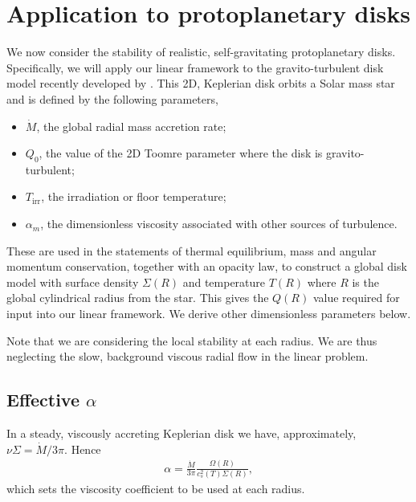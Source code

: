 \section{Application to protoplanetary disks}\label{2dppd}
We now consider the stability of realistic, self-gravitating
protoplanetary disks. Specifically, we will apply our linear framework
to the gravito-turbulent disk model recently developed by 
\cite{rafikov15}. This 2D, Keplerian disk orbits a Solar mass star and 
is defined by the following parameters, 

\begin{itemize}
  \item $\dot{M}$, the global radial mass accretion rate;
  \item $Q_0$, the value of the 2D Toomre parameter where the disk is
    gravito-turbulent;
  \item $T_\mathrm{irr}$, the irradiation or floor temperature;
  \item $\alpha_m$, the dimensionless viscosity associated with other
    sources of turbulence.
\end{itemize} 
These are used in the statements of thermal equilibrium, mass and
angular momentum conservation, together with an opacity law, 
to construct a global disk model with surface density $\Sigma(R)$ and
temperature $T(R)$ where $R$ is the global cylindrical radius from the
star. \citep[See][for details.]{rafikov15} This gives the $Q(R)$
value required for input into our linear framework. We derive other
dimensionless parameters below. 

Note that we are considering the local stability at each radius. We
are thus neglecting the slow, background viscous radial flow in the
linear problem. 


\subsection{Effective $\alpha$}
In a steady, viscously accreting Keplerian disk we have,
approximately, $\nu\Sigma = \dot{M}/3\pi$. Hence
\begin{align}
  \alpha = \frac{\dot{M}}{3\pi}\frac{\Omega(R)}{c_{s}^2(T)\Sigma(R)},  
\end{align} 
which sets the viscosity coefficient to be used at each radius. 

